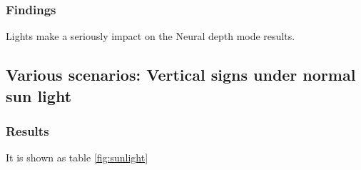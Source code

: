 \subsubsection{Findings}

Lights make a seriously impact on the Neural depth mode results. 

\subsection{Various scenarios: Vertical signs under normal sun light }

\subsubsection{Results}

It is shown as table \ref{fig:sunlight}

